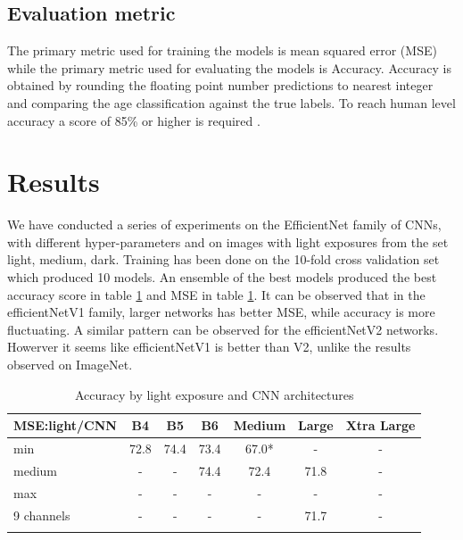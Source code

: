 \documentclass[10pt,letterpaper]{article}
\begin{document}
\subsection*{Evaluation metric}

The primary metric used for training the models is mean squared error (MSE)
while the primary metric used for evaluating the models is Accuracy.
Accuracy is obtained by rounding the floating point number predictions
to nearest integer and comparing the age classification against the true labels.
To reach human level accuracy a score of 85\% or higher is required \citep{ref_needed}.

\section*{Results}

We have conducted a series of experiments on the EfficientNet family of CNNs, 
with different hyper-parameters and on images with light exposures 
from the set light, medium, dark.
Training has been done on the 10-fold cross validation set which produced 10 models.
An ensemble of the best models produced the best accuracy score in 
table \ref{table1} and MSE in table \ref{table1}.
It can be observed that in the efficientNetV1 family,
larger networks has better MSE, while accuracy is more fluctuating.
A similar pattern can be observed for the efficientNetV2 networks.
Howerver it seems like efficientNetV1 is better than V2, unlike
the results observed on ImageNet.

\begin{center}
\begin{table}[hbt!]
\caption{Accuracy by light exposure and CNN architectures}
\begin{tabular}{ |l|c|c|c|c|c|c| }

\hline
MSE:light/CNN & B4 & B5 & B6 & Medium & Large & Xtra Large \\ \hline
min        & 72.8 & 74.4 & 73.4 & 67.0* & - & - \\ 
medium     & - & - & 74.4 & 72.4 & 71.8 & - \\ 
max        & - & - & - & - & - & - \\ 
9 channels & - & - & - & - & 71.7 & - \\ 
\hline
\label{table1}
\end{tabular}
\end{table}
\end{center}
\end{document}
